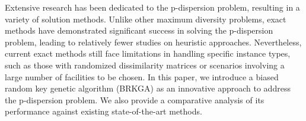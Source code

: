 \documentclass[preprint,12pt]{elsarticle}
\begin{document}
Extensive research has been dedicated to the p-dispersion problem, resulting in a variety of solution methods. Unlike other maximum diversity problems, exact methods have demonstrated significant success in solving the p-dispersion problem, leading to relatively fewer studies on heuristic approaches. Nevertheless, current exact methods still face limitations in handling specific instance types, such as those with randomized dissimilarity matrices or scenarios involving a large number of facilities to be chosen. In this paper, we introduce a biased random key genetic algorithm (BRKGA) \citet{Goncalves2011-kp} as an innovative approach to address the p-dispersion problem. We also provide a comparative analysis of its performance against existing state-of-the-art methods.

\end{document}
